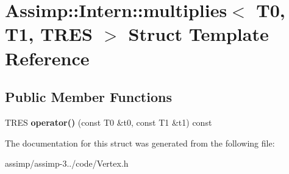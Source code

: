 \hypertarget{struct_assimp_1_1_intern_1_1multiplies}{\section{Assimp\+:\+:Intern\+:\+:multiplies$<$ T0, T1, T\+R\+E\+S $>$ Struct Template Reference}
\label{struct_assimp_1_1_intern_1_1multiplies}
}
\subsection*{Public Member Functions}
\begin{DoxyCompactItemize}
\item 
\hypertarget{struct_assimp_1_1_intern_1_1multiplies_a1ddb60e4e822d2634c971fa62ee74c56}{T\+R\+E\+S {\bfseries operator()} (const T0 \&t0, const T1 \&t1) const }\label{struct_assimp_1_1_intern_1_1multiplies_a1ddb60e4e822d2634c971fa62ee74c56}

\end{DoxyCompactItemize}


The documentation for this struct was generated from the following file\+:\begin{DoxyCompactItemize}
\item 
assimp/assimp-\/3../code/Vertex.\+h\end{DoxyCompactItemize}
